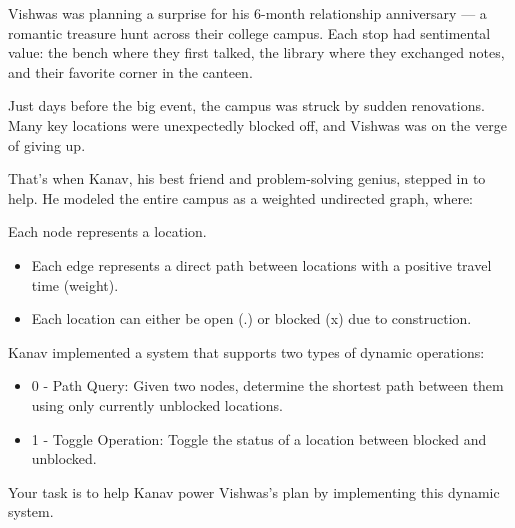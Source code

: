 Vishwas was planning a surprise for his 6-month relationship anniversary --- a romantic treasure hunt across their college campus. Each stop had sentimental value: the bench where they first talked, the library where they exchanged notes, and their favorite corner in the canteen.

Just days before the big event, the campus was struck by sudden renovations. Many key locations were unexpectedly blocked off, and Vishwas was on the verge of giving up.

That's when Kanav, his best friend and problem-solving genius, stepped in to help. He modeled the entire campus as a weighted undirected graph, where:

 Each node represents a location.
\begin{itemize}
\item Each edge represents a direct path between locations with a positive travel time (weight).
\item Each location can either be open (.) or blocked (x) due to construction.
\end{itemize}

Kanav implemented a system that supports two types of dynamic operations:
\begin{itemize}
\item 0 - Path Query: Given two nodes, determine the shortest path between them using only currently unblocked locations.
\item 1 - Toggle Operation: Toggle the status of a location between blocked and unblocked.
\end{itemize}

Your task is to help Kanav power Vishwas's plan by implementing this dynamic system.